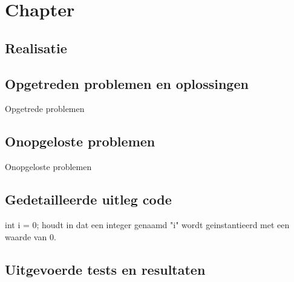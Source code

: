 \chapter{Chapter}
\section{Realisatie}
\newpage

\section{Opgetreden problemen en oplossingen}
Opgetrede problemen

\section{Onopgeloste problemen}
Onopgeloste problemen

\section{Gedetailleerde uitleg code}
int i = 0; houdt in dat een integer genaamd "i" wordt geinstantieerd met een waarde van 0.

\section{Uitgevoerde tests en resultaten}
